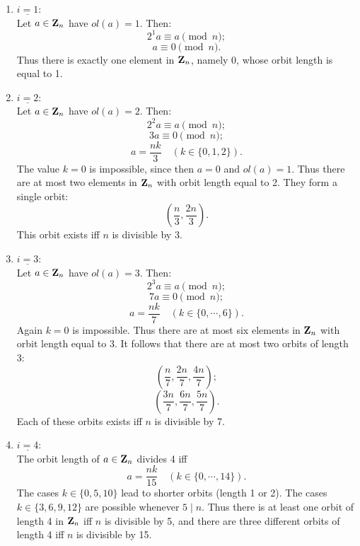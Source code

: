 {\begin{enumerate}
      \item $ \underline{i=1} $:\\ 
	    Let $ a \in {\bf Z}_{n} $ have $ ol(a)=1 $. Then:\\
	    $$ 2^1a \equiv a \pmod {n} ;$$
	    $$ a \equiv 0 \pmod {n} .$$                                
	    Thus there is exactly one element in $ {\bf Z}_{n} $, namely 0, 
	    whose orbit length is equal to 1.
      \item $ \underline{i=2} $:\\ 
	    Let $ a \in {\bf Z}_{n} $ have $ ol(a)=2 $. Then:\\
	    $$ 2^2a \equiv a\pmod {n} ;$$
	    $$ 3a \equiv 0 \pmod {n} ;$$                                
	    $$ a=\frac{nk}{3} \quad (k \in \{0,1,2\}). $$
	    The value $ k=0 $ is impossible, since then $ a=0 $ and   
	    $ol(a)=1 $. Thus there are at most two elements in $ {\bf Z}_{n} $ with 
	    orbit length equal to 2. They form a single orbit:\\
	    $$ (\frac{n}{3},\frac{2n}{3}) .$$
	    This orbit exists iff $ n $ is divisible by 3.
      \item $ \underline{i=3} $:\\ 
	    Let $ a \in {\bf Z}_{n} $ have $ ol(a)=3 $. Then:\\
	    $$ 2^3a \equiv a \pmod {n} ;$$
	    $$ 7a \equiv 0 \pmod {n} ;$$                                
	    $$ a=\frac{nk}{7} \quad (k\in \{0,\cdots,6\}). $$
	    Again $ k=0 $ is impossible.
	    Thus there are at most six elements in $ {\bf Z}_{n} $ with orbit length            
	    equal to 3. It follows that there are at most two orbits of length 3:\\
	    $$ (\frac{n}{7},\frac{2n}{7},\frac{4n}{7}) ;$$
	    $$ (\frac{3n}{7},\frac{6n}{7},\frac{5n}{7}) .$$
	    Each of these orbits exists iff $ n $ is divisible by 7.
    \item $ \underline{i=4} $:\\ 
	The orbit length of $a \in {\bf Z}_n$ divides 4 iff  
	    $$ a=\frac{nk}{15} \quad (k \in \{0,\cdots,14\}). $$
	  The cases $k \in \{0,5,10\}$ lead to shorter orbits (length 1 or 2). The cases 
	  $k \in \{3,6,9,12\}$ are possible whenever $5 \mid n $. Thus there is at least one 
	  orbit of length 4 
	  in ${\bf Z}_n$ iff $n$ is divisible by 5, and there are three different 
	  orbits of length 4 iff $n$ is divisible by 15. 
 

\end{enumerate}}
